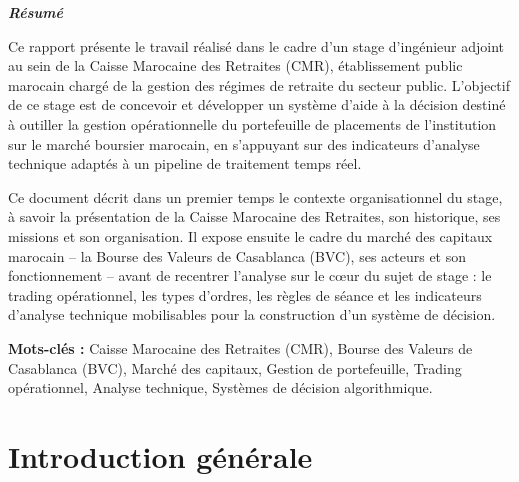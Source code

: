\documentclass{rapportENSIAS} %
\begin{document}
\vspace*{\fill}
\newpage

\vspace*{\fill}

\begin{center}
    {\itshape \LARGE \textbf{Résumé}}
\end{center}
\vspace{1cm}

\noindent
Ce rapport présente le travail réalisé dans le cadre d'un stage d'ingénieur adjoint au sein de la Caisse Marocaine des Retraites (CMR), établissement public marocain chargé de la gestion des régimes de retraite du secteur public. L'objectif de ce stage est de concevoir et développer un système d'aide à la décision destiné à outiller la gestion opérationnelle du portefeuille de placements de l'institution sur le marché boursier marocain, en s'appuyant sur des indicateurs d'analyse technique adaptés à un pipeline de traitement temps réel.

\vspace{0.3cm}
\noindent
Ce document décrit dans un premier temps le contexte organisationnel du stage, à savoir la présentation de la Caisse Marocaine des Retraites, son historique, ses missions et son organisation. Il expose ensuite le cadre du marché des capitaux marocain -- la Bourse des Valeurs de Casablanca (BVC), ses acteurs et son fonctionnement -- avant de recentrer l'analyse sur le c\oe ur du sujet de stage : le trading opérationnel, les types d'ordres, les règles de séance et les indicateurs d'analyse technique mobilisables pour la construction d'un système de décision.

\vspace{0.3cm}
\noindent
\textbf{Mots-clés :} Caisse Marocaine des Retraites (CMR), Bourse des Valeurs de Casablanca (BVC), Marché des capitaux, Gestion de portefeuille, Trading opérationnel, Analyse technique, Systèmes de décision algorithmique.

\vspace*{\fill}
\newpage

\tableofcontents
\newpage

\chapter*{Introduction générale}
{}
\vspace{\baselineskip}
\end{document}
